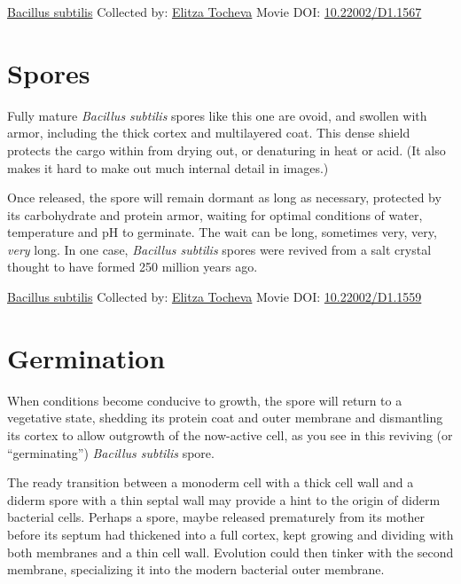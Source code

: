 \documentclass[]{tufte-book}
\begin{document}
\hypertarget{htmlwidget-081acd6193896c102bbc}{}

\label{fig:8-6b}\protect\hyperlink{tree}{Bacillus subtilis} Collected by: \protect\hyperlink{elitza_tocheva}{Elitza Tocheva} Movie DOI: \href{https://doi.org/10.22002/D1.1567}{10.22002/D1.1567}

\hypertarget{spores}{%
\section{Spores}\label{spores}}

Fully mature \emph{Bacillus subtilis} spores like this one are ovoid, and swollen with armor, including the thick cortex and multilayered coat. This dense shield protects the cargo within from drying out, or denaturing in heat or acid. (It also makes it hard to make out much internal detail in images.)

Once released, the spore will remain dormant as long as necessary, protected by its carbohydrate and protein armor, waiting for optimal conditions of water, temperature and pH to germinate. The wait can be long, sometimes very, very, \emph{very} long. In one case, \emph{Bacillus subtilis} spores were revived from a salt crystal thought to have formed 250 million years ago.



\hypertarget{htmlwidget-ee6fdd013898ed3a1900}{}

\label{fig:8-7}\protect\hyperlink{tree}{Bacillus subtilis} Collected by: \protect\hyperlink{elitza_tocheva}{Elitza Tocheva} Movie DOI: \href{https://doi.org/10.22002/D1.1559}{10.22002/D1.1559}

\hypertarget{germination}{%
\section{Germination}\label{germination}}

When conditions become conducive to growth, the spore will return to a vegetative state, shedding its protein coat and outer membrane and dismantling its cortex to allow outgrowth of the now-active cell, as you see in this reviving (or ``germinating'') \emph{Bacillus subtilis} spore.

The ready transition between a monoderm cell with a thick cell wall and a diderm spore with a thin septal wall may provide a hint to the origin of diderm bacterial cells. Perhaps a spore, maybe released prematurely from its mother before its septum had thickened into a full cortex, kept growing and dividing with both membranes and a thin cell wall. Evolution could then tinker with the second membrane, specializing it into the modern bacterial outer membrane.
\end{document}
